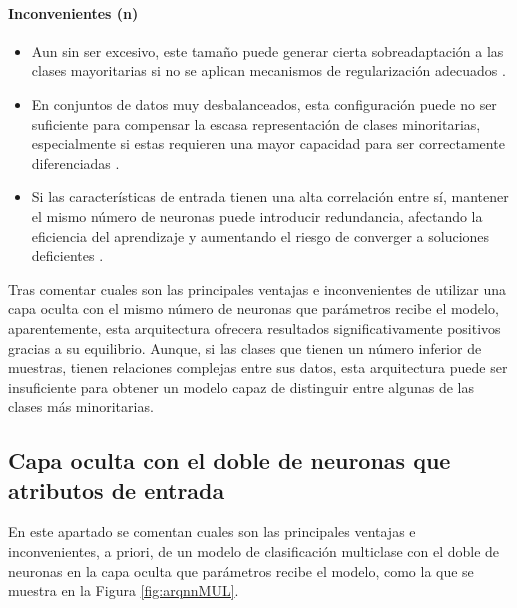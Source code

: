 \paragraph{Inconvenientes (n)}
\begin{itemize}
	\item Aun sin ser excesivo, este tamaño puede generar cierta sobreadaptación a las clases mayoritarias si no se aplican mecanismos de regularización adecuados \cite{goodfellow2016deep}.
	\item En conjuntos de datos muy desbalanceados, esta configuración puede no ser suficiente para compensar la escasa representación de clases minoritarias, especialmente si estas requieren una mayor capacidad para ser correctamente diferenciadas \cite{he2009learning}.
	\item Si las características de entrada tienen una alta correlación entre sí, mantener el mismo número de neuronas puede introducir redundancia, afectando la eficiencia del aprendizaje y aumentando el riesgo de converger a soluciones deficientes \cite{bengio2013representation}.
\end{itemize}

Tras comentar cuales son las principales ventajas e inconvenientes de utilizar una capa oculta con el mismo número de neuronas que parámetros recibe el modelo, aparentemente, esta arquitectura ofrecera resultados significativamente positivos gracias a su equilibrio. Aunque, si las clases que tienen un número inferior de muestras, tienen relaciones complejas entre sus datos, esta arquitectura puede ser insuficiente para obtener un modelo capaz de distinguir entre algunas de las clases más minoritarias.

\subsection{Capa oculta con el doble de neuronas que atributos de entrada}\label{sec:VIMUL98}
En este apartado se comentan cuales son las principales ventajas e inconvenientes, a priori, de un modelo de clasificación multiclase con el doble de neuronas en la capa oculta que parámetros recibe el modelo, como la que se muestra en la Figura \ref{fig:arqnnMUL}.

